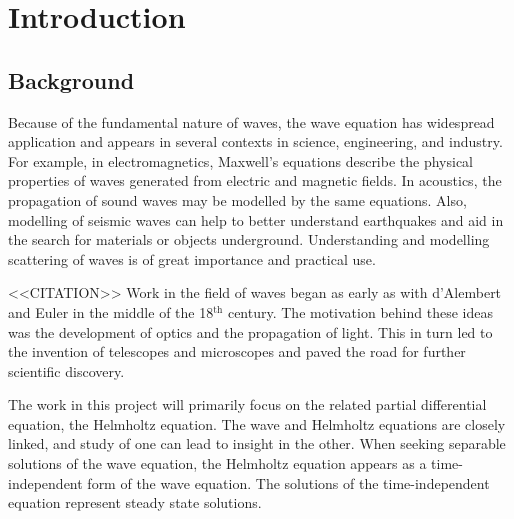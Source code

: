 \chapter{Introduction}


\iffalse Brief outline of the chapter below

Background:
	What is HH equation?
	What does it model?
	How is it derived?
	Boundary conditions
	- 	Sommerfield radiation condition
	
Finite element method:
	Discretisation of HH
	Discretisation of infinite domains
		D,N,radiation
	ABC, DtN, PML

Linear solvers:
	Iterative and direct
	Krylov methods
	Preconditioners
	How does this relate to Poisson and HH?
	- 	Small wavenumbers good convergence

Project direction:
	Where are we going? What to do...?
	Multigrid in non-cartesian coordinates
	Fourier decompostion of HH
	Explore implementation of PMLs
\fi


\section{Background}

\iffalse
Motivation.
Who cares? Why is it difficult?
What are the benefits?
Need some citations? Names in the field...
\fi



Because of the fundamental nature of waves, the wave equation has widespread application and appears in several contexts in science, engineering, and industry.
For example, in electromagnetics, Maxwell's equations describe the physical properties of waves generated from electric and magnetic fields.
In acoustics, the propagation of sound waves may be modelled by the same equations.
Also, modelling of seismic waves can help to better understand earthquakes and aid in the search for materials or objects underground.
Understanding and modelling scattering of waves is of great importance and practical use.

<<CITATION>>
Work in the field of waves began as early as with d'Alembert and Euler in the middle of the 18$^\text{th}$ century.
The motivation behind these ideas was the development of optics and the propagation of light.
This in turn led to the invention of telescopes and microscopes and paved the road for further scientific discovery.

The work in this project will primarily focus on the related partial differential equation, the Helmholtz equation.
The wave and Helmholtz equations are closely linked, and study of one can lead to insight in the other.
When seeking separable solutions of the wave equation, the Helmholtz equation appears as a time-independent form of the wave equation.
The solutions of the time-independent equation represent steady state solutions.

